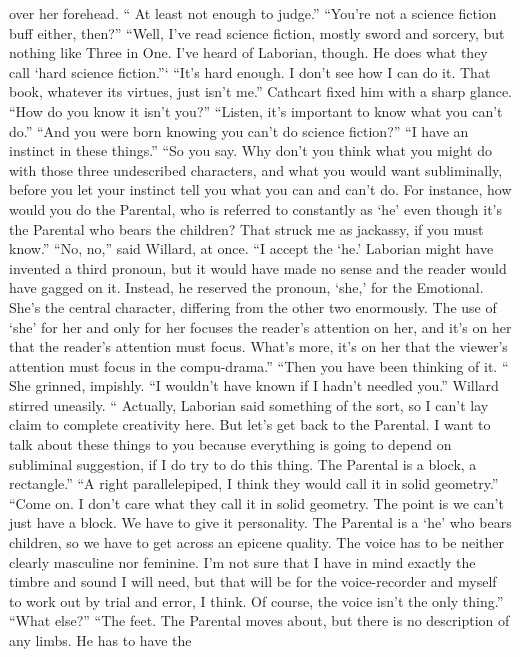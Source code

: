 \documentclass[a4paper,12pt]{article}
\begin{document}
over her forehead. “ At least not enough to judge.”
“You’re not a science fiction buff either, then?”
“Well, I’ve read science fiction, mostly sword and sorcery, but nothing like Three in One. I’ve
heard of Laborian, though. He does what they call ‘hard science fiction.”‘
“It’s hard enough. I don’t see how I can do it. That book, whatever its virtues, just isn’t me.”
Cathcart fixed him with a sharp glance. “How do you know it isn’t you?”
“Listen, it’s important to know what you can’t do.”
“And you were born knowing you can’t do science fiction?”
“I have an instinct in these things.”
“So you say. Why don’t you think what you might do with those three undescribed characters, and
what you would want subliminally, before you let your instinct tell you what you can and can’t do. For
instance, how would you do the Parental, who is referred to constantly as ‘he’ even though it’s the Parental
who bears the children? That struck me as jackassy, if you must know.”
“No, no,” said Willard, at once. “I accept the ‘he.’ Laborian might have invented a third pronoun,
but it would have made no sense and the reader would have gagged on it. Instead, he reserved the pronoun,
‘she,’ for the Emotional. She’s the central character, differing from the other two enormously. The use of
‘she’ for her and only for her focuses the reader’s attention on her, and it’s on her that the reader’s attention
must focus. What’s more, it’s on her that the viewer’s attention must focus in the compu-drama.”
“Then you have been thinking of it. “ She grinned, impishly. “I wouldn’t have known if I hadn’t
needled you.”
Willard stirred uneasily. “ Actually, Laborian said something of the sort, so I can’t lay claim to
complete creativity here. But let’s get back to the Parental. I want to talk about these things to you because
everything is going to depend on subliminal suggestion, if I do try to do this thing. The Parental is a block,
a rectangle.”
“A right parallelepiped, I think they would call it in solid geometry.”
“Come on. I don’t care what they call it in solid geometry. The point is we can’t just have a block.
We have to give it personality. The Parental is a ‘he’ who bears children, so we have to get across an
epicene quality. The voice has to be neither clearly masculine nor feminine. I’m not sure that I have in
mind exactly the timbre and sound I will need, but that will be for the voice-recorder and myself to work
out by trial and error, I think. Of course, the voice isn’t the only thing.”
“What else?”
“The feet. The Parental moves about, but there is no description of any limbs. He has to have the
\end{document}
